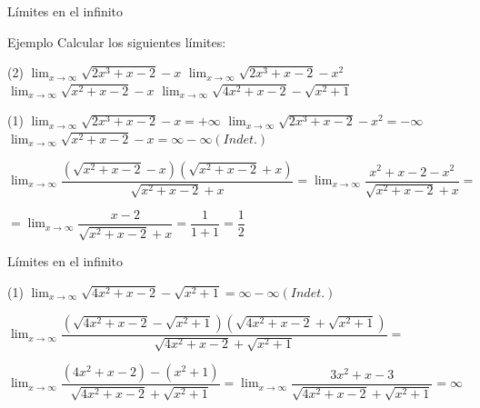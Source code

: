 \documentclass[8pt]{beamer}
\newcommand{\limite}[2]{\displaystyle \lim_{x \rightarrow #1}{#2}}
\begin{document}
\begin{frame}{Límites en el infinito}
\begin{exampleblock}{Ejemplo}
Calcular los siguientes límites:
\begin{tasks}[label=\alph*)](2)
\task $\limite{\infty}{\sqrt{2x^3+x-2}-x}$
\task $\limite{\infty}{\sqrt{2x^3+x-2}-x^2}$
\task $\limite{\infty}{\sqrt{x^2+x-2}-x}$
\task $\limite{\infty}{\sqrt{4x^2+x-2}-\sqrt{x^2+1}}$
\end{tasks}
\end{exampleblock}

\begin{tasks}[label=\alph*)](1)
\task $\limite{\infty}{\sqrt{2x^3+x-2}-x} = +\infty$
\task $\limite{\infty}{\sqrt{2x^3+x-2}-x^2}= - \infty$
\task $\limite{\infty}{\sqrt{x^2+x-2}-x}= \infty - \infty (Indet.)$

\vspace{10pt}
$\limite{\infty}{\dfrac{(\sqrt{x^2+x-2}-x)(\sqrt{x^2+x-2}+x)}{\sqrt{x^2+x-2}+x}}= 
\limite{\infty}{\dfrac{x^2+x-2-x^2}{\sqrt{x^2+x-2}+x}}= $

\vspace{10pt}
$=\limite{\infty}{\dfrac{x-2}{\sqrt{x^2+x-2}+x}}=\dfrac{1}{1+1}=\dfrac{1}{2}$

\end{tasks}

\end{frame}

\begin{frame}{Límites en el infinito}
\begin{tasks}[label=\alph*),resume](1)
\task $\limite{\infty}{\sqrt{4x^2+x-2}-\sqrt{x^2+1}}=\infty - \infty (Indet.)$

\vspace{10pt}
 $\limite{\infty}{\dfrac{(\sqrt{4x^2+x-2}-\sqrt{x^2+1})(\sqrt{4x^2+x-2}+\sqrt{x^2+1})}{\sqrt{4x^2+x-2}+\sqrt{x^2+1}}}=$
 
 \vspace{10pt}
$\limite{\infty}{\dfrac{(4x^2+x-2)-(x^2+1)}{\sqrt{4x^2+x-2}+\sqrt{x^2+1}}}= \limite{\infty}{\dfrac{3x^2+x-3}{\sqrt{4x^2+x-2}+\sqrt{x^2+1}}}= \infty$
\end{tasks}
\end{frame}
\end{document}
